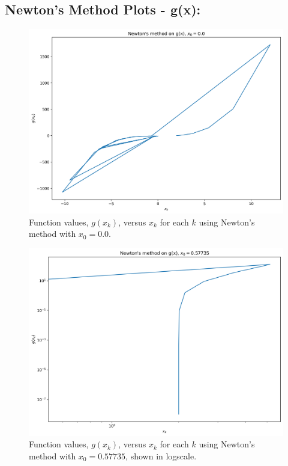 \documentclass[11pt]{article}
\begin{document}

\subsection{Newton's Method Plots - g(x):}
\begin{figure}[H]
	\centering
	\includegraphics[width=\linewidth]{../figures/Newtons_g_0.0}
	\caption{Function values, $g(x_k)$, versus $x_k$ for each $k$ using Newton's method with $x_0 = 0.0$.}
	\label{fig:newton_g_0.0}
\end{figure}

\begin{figure}[H]
	\centering
	\includegraphics[width=\linewidth]{../figures/Newtons_g_0.57735}
	\caption{Function values, $g(x_k)$, versus $x_k$ for each $k$ using Newton's method with $x_0 = 0.57735$, shown in logscale.}
	\label{fig:newton_g_0.57735}
\end{figure}
\end{document}
